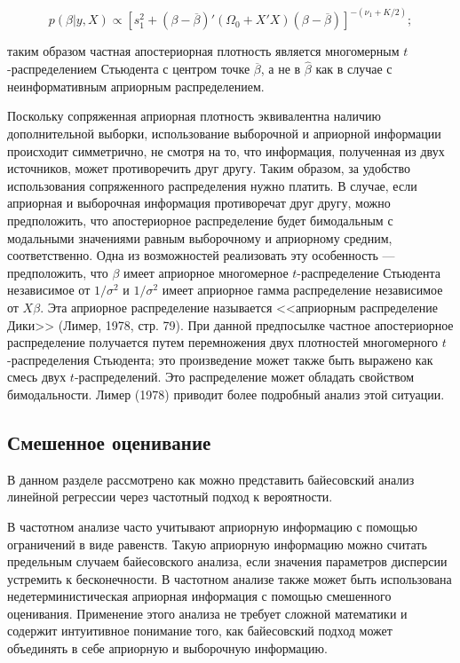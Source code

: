 \begin{equation}
p(\beta|y,X){\propto}\left[s^2_1+(\beta-\overline{\beta})'(\Omega_0+X'X)(\beta-\overline{\beta})\right]^{-(\nu_1+K/2)};
\end{equation}

таким образом частная апостериорная плотность является многомерным $t$-распределением Стьюдента с центром точке $\overline{\beta}$, а не в $\hat{\beta}$ как в случае с неинформативным априорным распределением.

Поскольку сопряженная априорная плотность эквивалентна наличию дополнительной выборки, использование выборочной и априорной информации происходит симметрично, не смотря на то, что информация, полученная из двух источников, может противоречить друг другу. 
Таким образом, за удобство использования сопряженного распределения нужно платить. 
В случае, если априорная и выборочная информация противоречат друг другу, можно предположить, что апостериорное распределение будет бимодальным с модальными значениями равным выборочному и априорному средним, соответственно. 
Одна из возможностей реализовать эту особенность --- предположить, что $\beta$ имеет априорное многомерное $t$-распределение Стьюдента независимое от $1/\sigma^2$ и $1/\sigma^2$ имеет априорное гамма распределение независимое от $X\beta$. Эта априорное распределение называется <<априорным распределение Дики>> (Лимер, 1978, стр. 79). При данной предпосылке частное  апостериорное распределение получается путем перемножения двух плотностей многомерного $t$-распределения Стьюдента; это произведение может также быть выражено как смесь двух  $t$-распределений. Это распределение может обладать свойством бимодальности. Лимер (1978) приводит более подробный анализ этой ситуации.

\subsection{Смешенное оценивание}

В данном разделе рассмотрено как можно представить байесовский анализ линейной регрессии через частотный подход к вероятности. 

В частотном анализе часто учитывают априорную информацию с помощью ограничений в виде равенств. Такую априорную информацию можно считать предельным случаем байесовского анализа, если значения параметров дисперсии устремить к бесконечности. В частотном анализе также может быть использована недетерминистическая априорная информация с помощью  смешенного оценивания. Применение этого анализа не требует сложной математики и содержит интуитивное понимание того, как байесовский подход может объединять в себе априорную и выборочную информацию. 

